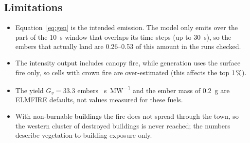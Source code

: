 \subsection{Limitations}
\begin{itemize}
  \item Equation~\eqref{eq:gen} is the intended emission. The model only emits over the part of the
        10~s window that overlaps its time steps (up to 30~s), so the embers that actually land are
        0.26--0.53 of this amount in the runs checked.
  \item The intensity output includes canopy fire, while generation uses the surface fire only, so
        cells with crown fire are over-estimated (this affects the top 1\,\%).
  \item The yield $G_v = 33.3$ embers \si{\per\second\per\mega\watt} and the ember mass of 0.2~g are
        ELMFIRE defaults, not values measured for these fuels.
  \item With non-burnable buildings the fire does not spread through the town, so the western cluster
        of destroyed buildings is never reached; the numbers describe vegetation-to-building exposure only.
\end{itemize}
